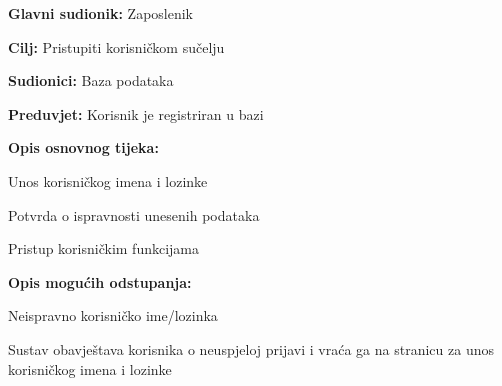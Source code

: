 			
					\noindent {}
				\begin{packed_item}
				
					\item \textbf{Glavni sudionik: }Zaposlenik
					\item  \textbf{Cilj:} Pristupiti korisničkom sučelju 
					\item  \textbf{Sudionici:} Baza podataka
					\item  \textbf{Preduvjet:} Korisnik je registriran u bazi 
					\item  \textbf{Opis osnovnog tijeka:}
				
					\item[] \begin{packed_enum}
						
						\item Unos korisničkog imena i lozinke 
						\item Potvrda o ispravnosti unesenih podataka
						\item Pristup korisničkim funkcijama 
					\end{packed_enum}
					\item  \textbf{Opis mogućih odstupanja:} 
				
					\item[] \begin{packed_item}
					
						\item[2.a] Neispravno korisničko ime/lozinka
						\item[] \begin{packed_enum}
						
							\item Sustav obavještava korisnika o neuspjeloj prijavi i vraća ga na stranicu za unos korisničkog imena i lozinke  
						
						\end{packed_enum}
					\end{packed_item}
				\end{packed_item}
		
				

